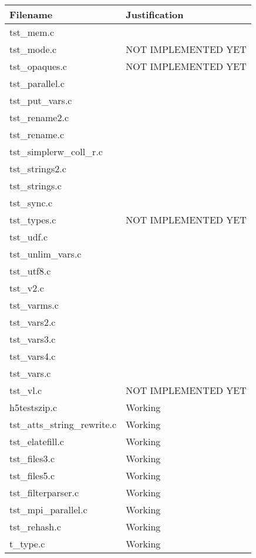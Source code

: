 \begin{table}[H]
\centering
\begin{tabular}{|l|l|}
\hline
Filename & Justification \\ \hline \hline
tst\_mem.c   &       \\ \hline
tst\_mode.c   &   NOT IMPLEMENTED YET    \\ \hline
tst\_opaques.c   &  NOT IMPLEMENTED YET     \\ \hline
tst\_parallel.c   &       \\ \hline
tst\_put\_vars.c   &       \\ \hline
tst\_rename2.c   &       \\ \hline
tst\_rename.c   &       \\ \hline
tst\_simplerw\_coll\_r.c   &       \\ \hline
tst\_strings2.c   &       \\ \hline
tst\_strings.c   &       \\ \hline
tst\_sync.c   &       \\ \hline
tst\_types.c   &  NOT IMPLEMENTED YET     \\ \hline
tst\_udf.c   &       \\ \hline
tst\_unlim\_vars.c   &       \\ \hline
tst\_utf8.c   &       \\ \hline
tst\_v2.c   &       \\ \hline
tst\_varms.c   &       \\ \hline
tst\_vars2.c   &       \\ \hline
tst\_vars3.c   &       \\ \hline
tst\_vars4.c   &       \\ \hline
tst\_vars.c   &       \\ \hline
tst\_vl.c   &   NOT IMPLEMENTED YET    \\ \hline
h5testszip.c   & Working   \\ \hline
tst\_atts\_string\_rewrite.c   & Working   \\ \hline
tst\_elatefill.c   & Working   \\ \hline
tst\_files3.c   & Working   \\ \hline
tst\_files5.c   & Working   \\ \hline
tst\_filterparser.c   & Working   \\ \hline
tst\_mpi\_parallel.c   & Working   \\ \hline
tst\_rehash.c   & Working   \\ \hline
t\_type.c   & Working   \\ \hline
\end{tabular}
\caption{}
\end{table}

